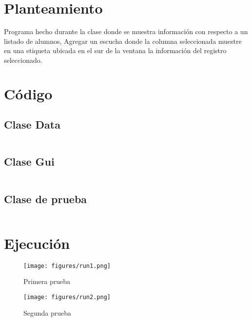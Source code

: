 \documentclass[12pt]{article}
\author{Pablo Vargas Bermúdez}
\begin{document}
\pagestyle{empty}

% 

\section*{Planteamiento}

Programa hecho durante la clase donde se muestra información con
respecto a un listado de alumnos, Agregar un escucha donde la columna
seleccionada muestre en una etiqueta ubicada en el sur de la ventana
la información del registro seleccionado.

\section*{Código}

\subsection*{Clase Data}
\inputminted{Java}{Data.java}
\subsection*{Clase Gui}
\inputminted{Java}{Gui.java}
\subsection*{Clase de prueba}
\inputminted{Java}{Prueba.java}

\section*{Ejecución}

\begin{figure}[ht]
  \centering
  \texttt{[image: figures/run1.png]}
  \caption{Primera prueba}
\end{figure}

\begin{figure}[ht]
  \centering
  \texttt{[image: figures/run2.png]}
  \caption{Segunda prueba}
\end{figure}
\end{document}
